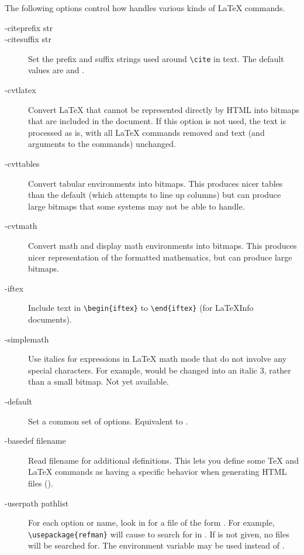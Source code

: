 \documentclass[twoside]{doctext/linfoem}
\begin{document}
The following options control how  handles various kinds of LaTeX
commands.
\begin{description}
\item[-citeprefix str]
\item[-citesuffix str]
Set the prefix and suffix strings used around
\verb+\cite+ in text.  The default values are \code{[} and \code{]}.

\item[-cvtlatex]Convert LaTeX that cannot be represented directly by HTML
into bitmaps that 
are included in the document.  If this option is not used, the text is
processed 
as is, with all LaTeX commands removed and text (and arguments to the
commands) unchanged.

\item[-cvttables]Convert tabular environments into bitmaps.  This produces
nicer tables than the default (which attempts to line up columns) but can
produce large bitmaps that some systems may not be able to handle.

\item[-cvtmath]Convert math and display math environments into bitmaps.  This
produces nicer representation of the formatted mathematics, but can produce
large bitmaps.

\item[-iftex]Include text in \verb+\begin{iftex}+ to
\verb+\end{iftex}+ (for LaTeXInfo documents).

\item[-simplemath]Use italics for
expressions in LaTeX math mode that do not involve any special characters.
For example,  would be changed into an italic 3, rather than a small
bitmap.  Not yet available.

\item[-default]Set a common set of options.  Equivalent to .

\item[-basedef filename]Read filename for additional definitions.  This lets
you define some TeX and LaTeX commands as having a specific behavior when
generating HTML files ().

\item[-userpath pathlist]For each  option or
   name, look in  for a file of the form
  .  For example, \verb+\usepackage{refman}+ will cause
   to search for  in .  If
   is not given, no files will be searched for.  The
  environment variable  may be used instead of
  . 
\end{description}
\end{document}
